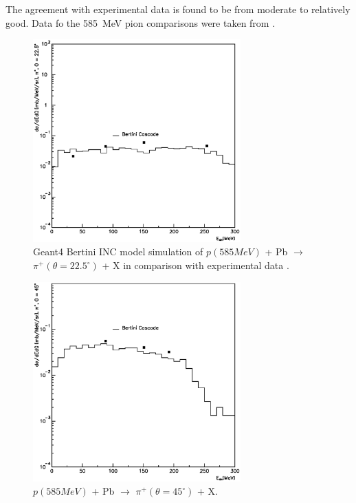 \documentclass[twocolumn,twoside,slac,floatfix]{revtex4}
\begin{document}
The agreement with experimental data is found to be from moderate to relatively good. Data fo the 585~MeV pion comparisons were taken from \cite{585lead}.

 
\begin{figure}
  \includegraphics[width=80mm,keepaspectratio]{pn_pb_597_pip_a0.eps}
  \caption{Geant4 Bertini INC model simulation of
$p(585 MeV)$ + Pb $\rightarrow$ $\pi^{+}(\theta = 22.5^{\circ})$ + X
in comparison with experimental data \cite{585lead}.}
  \label{pi22}
\end{figure}
 

\begin{figure}
  \includegraphics[width=80mm,keepaspectratio]{pn_pb_597_pip_a1.eps}
  \caption{$p(585 MeV)$ + Pb $\rightarrow$ $\pi^{+}(\theta = 45^{\circ})$ + X.}
  \label{pi45}
\end{figure}
\end{document}
